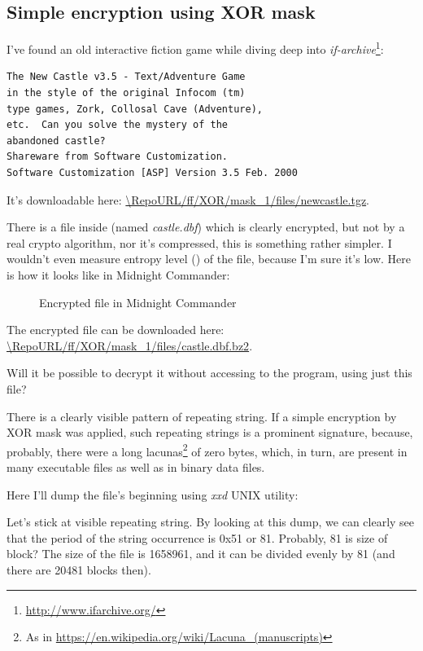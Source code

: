 \subsection{Simple encryption using XOR mask}
\label{XOR_mask_1}

I've found an old interactive fiction game while diving deep into \emph{if-archive}\footnote{\url{http://www.ifarchive.org/}}:

\begin{lstlisting}
The New Castle v3.5 - Text/Adventure Game
in the style of the original Infocom (tm)
type games, Zork, Collosal Cave (Adventure),
etc.  Can you solve the mystery of the
abandoned castle?
Shareware from Software Customization.
Software Customization [ASP] Version 3.5 Feb. 2000
\end{lstlisting}

It's downloadable here: \url{\RepoURL/ff/XOR/mask_1/files/newcastle.tgz}.

There is a file inside (named \emph{castle.dbf}) which is clearly encrypted, but not by a real crypto algorithm, nor it's compressed, this is something rather simpler.
I wouldn't even measure entropy level () of the file, because I'm sure it's low.
Here is how it looks like in Midnight Commander:

\begin{figure}[H]
\centering
{}
\caption{Encrypted file in Midnight Commander}
\end{figure}

The encrypted file can be downloaded here:
\url{\RepoURL/ff/XOR/mask_1/files/castle.dbf.bz2}.

Will it be possible to decrypt it without accessing to the program, using just this file?

There is a clearly visible pattern of repeating string.
If a simple encryption by XOR mask was applied, such repeating strings is a prominent signature,
because, probably, there were a long lacunas\footnote{As in \url{https://en.wikipedia.org/wiki/Lacuna_(manuscripts)}}
of zero bytes,
which, in turn, are present in many executable files as well as in binary data files.

Here I'll dump the file's beginning using \emph{xxd} UNIX utility:



Let's stick at visible repeating  string.
By looking at this dump, we can clearly see that the period of the string occurrence is 0x51 or 81.
Probably, 81 is size of block?
The size of the file is 1658961, and it can be divided evenly by 81 (and there are 20481 blocks then).

